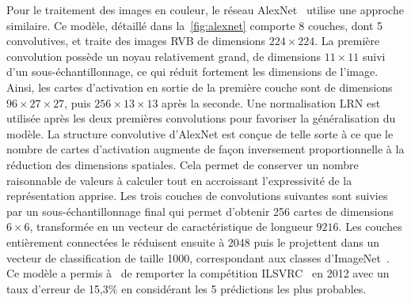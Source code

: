 Pour le traitement des images en couleur, le réseau AlexNet~\cite{krizhevsky_imagenet_2012} utilise une approche similaire. Ce modèle, détaillé dans la~\cref{fig:alexnet} comporte 8 couches, dont 5 convolutives, et traite des images \gls{RVB} de dimensions $224\times224$. La première convolution possède un noyau relativement grand, de dimensions $11\times11$ suivi d'un sous-échantillonnage, ce qui réduit fortement les dimensions de l'image. Ainsi, les cartes d'activation en sortie de la première couche sont de dimensions $96\times27\times27$, puis $256\times13\times13$ après la seconde. Une normalisation \gls{LRN} est utilisée après les deux premières convolutions pour favoriser la généralisation du modèle. La structure convolutive d'AlexNet est conçue de telle sorte à ce que le nombre de cartes d'activation augmente de façon inversement proportionnelle à la réduction des dimensions spatiales. Cela permet de conserver un nombre raisonnable de valeurs à calculer tout en accroissant l'expressivité de la représentation apprise. Les trois couches de convolutions suivantes sont suivies par un sous-échantillonnage final qui permet d'obtenir 256 cartes de dimensions $6\times6$, transformée en un vecteur de caractéristique de longueur $9216$. Les couches entièrement connectées le réduisent ensuite à 2048 puis le projettent dans un vecteur de classification de taille 1000, correspondant aux classes d'ImageNet~\cite{deng_imagenet_2009}. Ce modèle a permis à~\citet{krizhevsky_imagenet_2012} de remporter la compétition \gls{ILSVRC}~\cite{russakovsky_imagenet_2015} en 2012 avec un taux d'erreur de 15,3\% en considérant les 5 prédictions les plus probables.

